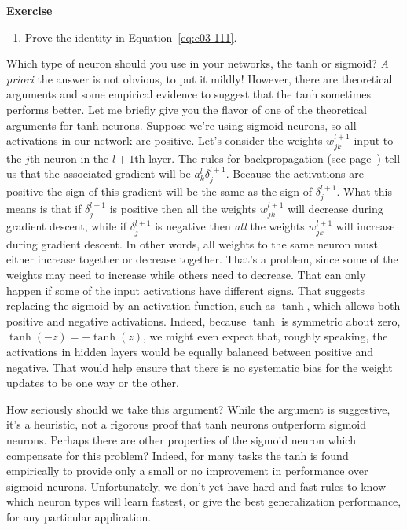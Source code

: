\textbf{Exercise}

\begin{enumerate}
\item Prove the identity in Equation~\ref{eq:c03-111}.
\end{enumerate}    




Which type of neuron should you use in your networks, the tanh or sigmoid? \textit{A priori} the answer is not obvious, to put it mildly! However, there are theoretical arguments and some empirical evidence to suggest that the tanh sometimes performs better. Let me briefly give you the flavor of one of the theoretical arguments for tanh neurons. Suppose we're using sigmoid neurons, so all activations in our network are positive. Let's consider the weights $w^{l+1}_{jk}$ input to the $j$th neuron in the $l+1$th layer. The rules for backpropagation (see page~\pageref{eq:c02-BP4}) tell us that the associated gradient will be $a^l_k \delta^{l+1}_j$. 
Because the activations are positive the sign of this gradient will be the same as the sign of $\delta^{l+1}_j$. What this means is that if $\delta^{l+1}_j$ is positive then all the weights $w^{l+1}_{jk}$ will decrease during gradient descent, while if $\delta^{l+1}_j$ is negative then \textit{all} the weights $w^{l+1}_{jk}$ will increase during gradient descent. In other words, all weights to the same neuron must either increase together or decrease together. That's a problem, since some of the weights may need to increase while others need to decrease. That can only happen if some of the input activations have different signs. That suggests replacing the sigmoid by an activation function, such as $\tanh$, which allows both positive and negative activations. Indeed, because $\tanh$ is symmetric about zero, $\tanh(-z) = -\tanh(z)$, we might even expect that, roughly speaking, the activations in hidden layers would be equally balanced between positive and negative. That would help ensure that there is no systematic bias for the weight updates to be one way or the other.

    How seriously should we take this argument? While the argument is suggestive, it's a heuristic, not a rigorous proof that tanh neurons outperform sigmoid neurons. Perhaps there are other properties of the sigmoid neuron which compensate for this problem? Indeed, for many tasks the tanh is found empirically to provide only a small or no improvement in performance over sigmoid neurons. Unfortunately, we don't yet have hard-and-fast rules to know which neuron types will learn fastest, or give the best generalization performance, for any particular application.
    
